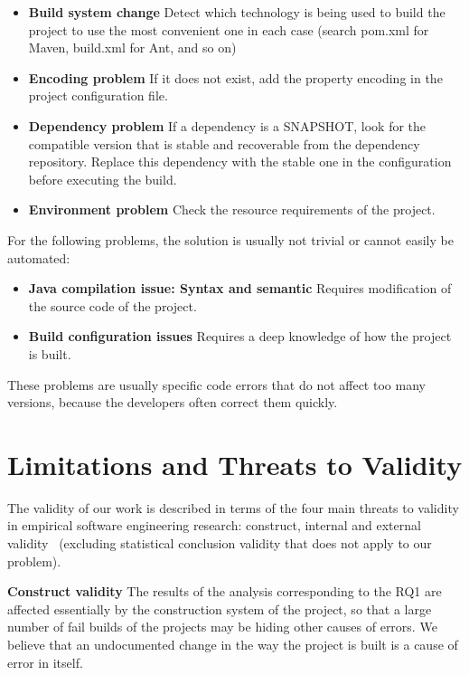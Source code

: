 \begin{itemize}
	\item \textbf{Build system change} Detect which technology is being used to build the project to use the most convenient one in each case (search pom.xml for Maven, build.xml for Ant, and so on)
	\item \textbf{Encoding problem} If it does not exist, add the property encoding in the project configuration file.
	\item \textbf{Dependency problem} If a dependency is a SNAPSHOT, look for the compatible version that is stable and recoverable from the dependency repository. Replace this dependency with the stable one in the configuration before executing the build.
	\item \textbf{Environment problem} Check the resource requirements of the project.
\end{itemize}

For the following problems, the solution is usually not trivial or cannot easily be automated:

\begin{itemize}
	\item \textbf{Java compilation issue: Syntax and semantic} Requires modification of the source code of the project.
	\item \textbf{Build configuration issues} Requires a deep knowledge of how the project is built.
\end{itemize}

These problems are usually specific code errors that do not affect too many versions, because the developers often correct them quickly.

\section{Limitations and Threats to Validity}

The validity of our work is described in terms of the four main threats to validity in empirical software engineering research: construct, internal and external validity~\cite{Wohlin2012} (excluding statistical conclusion validity that does not apply to our problem).


\textbf{Construct validity} 
The results of the analysis corresponding to the RQ1 are affected essentially by the construction system of the project, so that a large number of fail builds of the projects may be hiding other causes of errors. We believe that an undocumented change in the way the project is built is a cause of error in itself.

